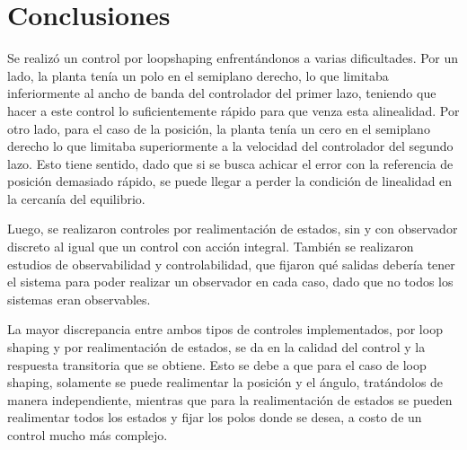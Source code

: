 
\section{Conclusiones}

Se realizó un control por loopshaping enfrentándonos a varias dificultades. Por un lado, la planta tenía un polo en el semiplano derecho, lo que limitaba inferiormente al ancho de banda del controlador del primer lazo, teniendo que hacer a este control lo suficientemente rápido para que venza esta alinealidad. Por otro lado, para el caso de la posición, la planta tenía un cero en el semiplano derecho lo que limitaba superiormente a la velocidad del controlador del segundo lazo. Esto tiene sentido, dado que si se busca achicar el error con la referencia de posición demasiado rápido, se puede llegar a perder la condición de linealidad en la cercanía del equilibrio. 

Luego, se realizaron controles por realimentación de estados, sin y con observador discreto al igual que un control con acción integral. También se realizaron estudios de observabilidad y controlabilidad, que fijaron qué salidas debería tener el sistema para poder realizar un observador en cada caso, dado que no todos los sistemas eran observables.

La mayor discrepancia entre ambos tipos de controles implementados, por loop shaping y por realimentación de estados, se da en la calidad del control y la respuesta transitoria que se obtiene. Esto se debe a que para el caso de loop shaping, solamente se puede realimentar la posición y el ángulo, tratándolos de manera independiente, mientras que para la realimentación de estados se pueden realimentar todos los estados y fijar los polos donde se desea, a costo de un control mucho más complejo.

